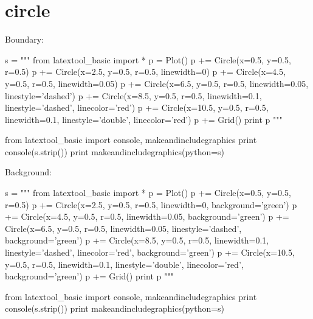 \section{circle}

Boundary:
\begin{python}
s = """
from latextool_basic import *
p = Plot()
p += Circle(x=0.5, y=0.5, r=0.5)
p += Circle(x=2.5, y=0.5, r=0.5, linewidth=0)
p += Circle(x=4.5, y=0.5, r=0.5, linewidth=0.05)
p += Circle(x=6.5, y=0.5, r=0.5, linewidth=0.05, linestyle='dashed')
p += Circle(x=8.5, y=0.5, r=0.5, linewidth=0.1, linestyle='dashed', 
                                 linecolor='red')
p += Circle(x=10.5, y=0.5, r=0.5, linewidth=0.1, linestyle='double', 
                                 linecolor='red')
p += Grid()
print p
"""

from latextool_basic import console, makeandincludegraphics
print console(s.strip())
print makeandincludegraphics(python=s)
\end{python}


Background:
\begin{python}
s = """
from latextool_basic import *
p = Plot()
p += Circle(x=0.5, y=0.5, r=0.5)
p += Circle(x=2.5, y=0.5, r=0.5, linewidth=0, background='green')
p += Circle(x=4.5, y=0.5, r=0.5, linewidth=0.05, background='green')
p += Circle(x=6.5, y=0.5, r=0.5, linewidth=0.05, linestyle='dashed',
                                 background='green')
p += Circle(x=8.5, y=0.5, r=0.5, linewidth=0.1, linestyle='dashed', 
                                 linecolor='red', background='green')
p += Circle(x=10.5, y=0.5, r=0.5, linewidth=0.1, linestyle='double', 
                                 linecolor='red', background='green')
p += Grid()
print p
"""

from latextool_basic import console, makeandincludegraphics
print console(s.strip())
print makeandincludegraphics(python=s)
\end{python}




